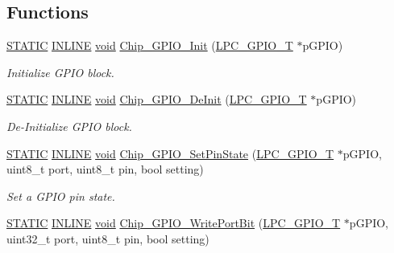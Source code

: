 \subsection*{Functions}
\begin{DoxyCompactItemize}
\item 
\hyperlink{group__LPC__Types__Public__Macros_ga10b2d890d871e1489bb02b7e70d9bdfb}{S\-T\-A\-T\-I\-C} \hyperlink{group__LPC__Types__Public__Types_ga2eb6f9e0395b47b8d5e3eeae4fe0c116}{I\-N\-L\-I\-N\-E} \hyperlink{Paradigm_2Tern__EE_2small_2portmacro_8h_a14d32f8130d3c0b212cfc751730b5b49}{void} \hyperlink{group__GPIO__17XX__40XX_gaeaca39372c8ff9f288243a20dd2259ce}{Chip\-\_\-\-G\-P\-I\-O\-\_\-\-Init} (\hyperlink{structLPC__GPIO__T}{L\-P\-C\-\_\-\-G\-P\-I\-O\-\_\-\-T} $\ast$p\-G\-P\-I\-O)
\begin{DoxyCompactList}\small\item\em Initialize G\-P\-I\-O block. \end{DoxyCompactList}\item 
\hyperlink{group__LPC__Types__Public__Macros_ga10b2d890d871e1489bb02b7e70d9bdfb}{S\-T\-A\-T\-I\-C} \hyperlink{group__LPC__Types__Public__Types_ga2eb6f9e0395b47b8d5e3eeae4fe0c116}{I\-N\-L\-I\-N\-E} \hyperlink{Paradigm_2Tern__EE_2small_2portmacro_8h_a14d32f8130d3c0b212cfc751730b5b49}{void} \hyperlink{group__GPIO__17XX__40XX_ga260a25e615613c663745ed72203dd7a6}{Chip\-\_\-\-G\-P\-I\-O\-\_\-\-De\-Init} (\hyperlink{structLPC__GPIO__T}{L\-P\-C\-\_\-\-G\-P\-I\-O\-\_\-\-T} $\ast$p\-G\-P\-I\-O)
\begin{DoxyCompactList}\small\item\em De-\/\-Initialize G\-P\-I\-O block. \end{DoxyCompactList}\item 
\hyperlink{group__LPC__Types__Public__Macros_ga10b2d890d871e1489bb02b7e70d9bdfb}{S\-T\-A\-T\-I\-C} \hyperlink{group__LPC__Types__Public__Types_ga2eb6f9e0395b47b8d5e3eeae4fe0c116}{I\-N\-L\-I\-N\-E} \hyperlink{Paradigm_2Tern__EE_2small_2portmacro_8h_a14d32f8130d3c0b212cfc751730b5b49}{void} \hyperlink{group__GPIO__17XX__40XX_ga2d8db9f0a52f061d64e8cada713ae03e}{Chip\-\_\-\-G\-P\-I\-O\-\_\-\-Set\-Pin\-State} (\hyperlink{structLPC__GPIO__T}{L\-P\-C\-\_\-\-G\-P\-I\-O\-\_\-\-T} $\ast$p\-G\-P\-I\-O, uint8\-\_\-t port, uint8\-\_\-t pin, bool setting)
\begin{DoxyCompactList}\small\item\em Set a G\-P\-I\-O pin state. \end{DoxyCompactList}\item 
\hyperlink{group__LPC__Types__Public__Macros_ga10b2d890d871e1489bb02b7e70d9bdfb}{S\-T\-A\-T\-I\-C} \hyperlink{group__LPC__Types__Public__Types_ga2eb6f9e0395b47b8d5e3eeae4fe0c116}{I\-N\-L\-I\-N\-E} \hyperlink{Paradigm_2Tern__EE_2small_2portmacro_8h_a14d32f8130d3c0b212cfc751730b5b49}{void} \hyperlink{group__GPIO__17XX__40XX_ga4ce4cce2499df5cee49a591ee5be6a48}{Chip\-\_\-\-G\-P\-I\-O\-\_\-\-Write\-Port\-Bit} (\hyperlink{structLPC__GPIO__T}{L\-P\-C\-\_\-\-G\-P\-I\-O\-\_\-\-T} $\ast$p\-G\-P\-I\-O, uint32\-\_\-t port, uint8\-\_\-t pin, bool setting)

\end{DoxyCompactItemize}
